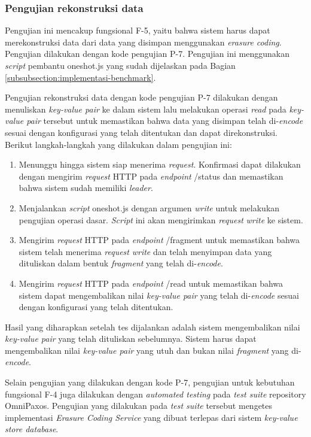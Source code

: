 \subsubsection{Pengujian rekonstruksi data}
\label{subsubsection:pengujian-rekonstruksi-data}

Pengujian ini mencakup fungsional F-5, yaitu bahwa sistem harus dapat merekonstruksi data dari data yang disimpan menggunakan \textit{erasure coding}. Pengujian dilakukan dengan kode pengujian P-7. Pengujian ini menggunakan \textit{script} pembantu oneshot.js yang sudah dijelaskan pada Bagian \ref{subsubsection:implementasi-benchmark}. 

Pengujian rekonstruksi data dengan kode pengujian P-7 dilakukan dengan menuliskan \textit{key-value pair} ke dalam sistem lalu melakukan operasi \textit{read} pada \textit{key-value pair} tersebut untuk memastikan bahwa data yang disimpan telah di-\textit{encode} sesuai dengan konfigurasi yang telah ditentukan dan dapat direkonstruksi. Berikut langkah-langkah yang dilakukan dalam pengujian ini:

\begin{enumerate}
  \item Menunggu hingga sistem siap menerima \textit{request}. Konfirmasi dapat dilakukan dengan mengirim \textit{request} HTTP pada \textit{endpoint} /status dan memastikan bahwa sistem sudah memiliki \textit{leader}.
  \item Menjalankan \textit{script} oneshot.js dengan argumen \textit{write} untuk melakukan pengujian operasi dasar. \textit{Script} ini akan mengirimkan \textit{request} \textit{write} ke sistem.
  \item Mengirim \textit{request} HTTP pada \textit{endpoint} /fragment untuk memastikan bahwa sistem telah menerima \textit{request} \textit{write} dan telah menyimpan data yang dituliskan dalam bentuk \textit{fragment} yang telah di-\textit{encode}.
  \item Mengirim \textit{request} HTTP pada \textit{endpoint} /read untuk memastikan bahwa sistem dapat mengembalikan nilai \textit{key-value pair} yang telah di-\textit{encode} sesuai dengan konfigurasi yang telah ditentukan.
\end{enumerate}

Hasil yang diharapkan setelah tes dijalankan adalah sistem mengembalikan nilai \textit{key-value pair} yang telah dituliskan sebelumnya. Sistem harus dapat mengembalikan nilai \textit{key-value pair} yang utuh dan bukan nilai \textit{fragment} yang di-\textit{encode}.

Selain pengujian yang dilakukan dengan kode P-7, pengujian untuk kebutuhan fungsional F-4 juga dilakukan dengan \textit{automated testing} pada \textit{test suite} repository OmniPaxos. Pengujian yang dilakukan pada \textit{test suite} tersebut mengetes implementasi \textit{Erasure Coding Service} yang dibuat terlepas dari sistem \textit{key-value store database}.